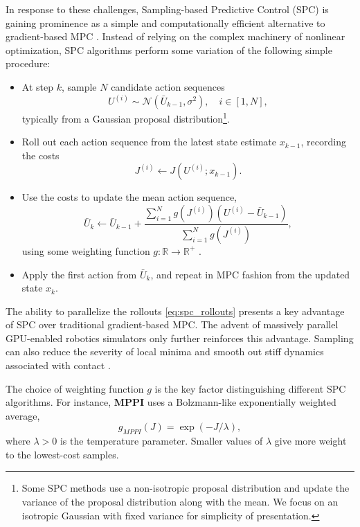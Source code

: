 \documentclass[letterpaper, 10 pt]{ieeeconf}
\begin{document}
In response to these challenges, Sampling-based Predictive Control (SPC) is gaining prominence as a simple and computationally efficient alternative to gradient-based MPC \cite{williams2016aggressive, williams2017model, li2024drop, xue2024full, vlahov2024mppi}. Instead of relying on the complex machinery of nonlinear optimization, SPC algorithms perform some variation of the following simple procedure:
\begin{itemize}
    \item At step $k$, sample $N$ candidate action sequences
    \begin{equation}\label{eq:spc_proposal}
        U^{(i)} \sim \mathcal{N}(\bar{U}_{k-1}, \sigma^2), \quad i \in [1, N],
    \end{equation}
    typically from a Gaussian proposal distribution\footnote{Some SPC methods use a non-isotropic proposal distribution and update the variance of the proposal distribution along with the mean. We focus on an isotropic Gaussian with fixed variance for simplicity of presentation.}.
    \item Roll out each action sequence from the latest state estimate $x_{k-1}$, recording the costs
    \begin{equation}\label{eq:spc_rollouts}
        J^{(i)} \gets J\left(U^{(i)}; x_{k-1}\right).
    \end{equation}
    \item Use the costs to update the mean action sequence,
    \begin{equation}\label{eq:spc_update}
        \bar{U}_{k} \gets \bar{U}_{k-1} + \frac{\sum_{i=1}^{N} g(J^{(i)})(U^{(i)} - \bar{U}_{k-1})}{\sum_{i=1}^N g(J^{(i)})},
    \end{equation}
    using some weighting function $g : \mathbb{R} \to \mathbb{R}^+$ .
    \item Apply the first action from $\bar{U}_{k}$, and repeat in MPC fashion from the updated state $x_k$.
\end{itemize}

The ability to parallelize the rollouts \eqref{eq:spc_rollouts} presents a key advantage of SPC over traditional gradient-based MPC. The advent of massively parallel GPU-enabled robotics simulators \cite{mjx, Genesis, makoviychuk2021isaac} only further reinforces this advantage. Sampling can also reduce the severity of local minima and smooth out stiff dynamics associated with contact \cite{suh2022bundled, le2024leveraging}.

The choice of weighting function $g$ is the key factor distinguishing different SPC algorithms. For instance, \textbf{MPPI} \cite{williams2016aggressive} uses a Bolzmann-like exponentially weighted average,
\begin{equation}\label{eq:mppi_g}
    g_{MPPI}(J) = \exp\left(- J / \lambda \right),
\end{equation}
where $\lambda > 0$ is the temperature parameter. Smaller values of $\lambda$ give more weight to the lowest-cost samples. 
\end{document}

